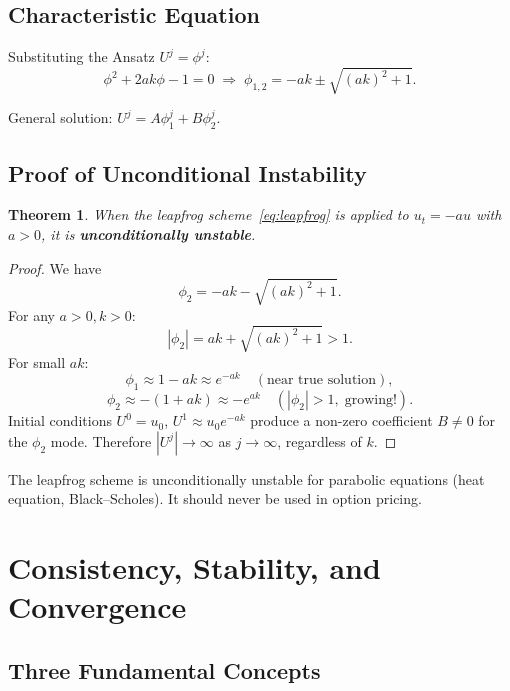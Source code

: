 \documentclass[12pt,a4paper]{article}
\theoremstyle{plain}
\newtheorem{theorem}{Theorem}[section]
\theoremstyle{definition}
\theoremstyle{remark}
\begin{document}
\subsection{Characteristic Equation}

Substituting the Ansatz $U^{j}=\phi^{j}$:
\[
  \phi^{2}+2ak\phi-1=0
  \;\Longrightarrow\;
  \phi_{1,2}=-ak\pm\sqrt{(ak)^{2}+1}.
\]

General solution: $U^{j}=A\phi_{1}^{j}+B\phi_{2}^{j}$.

\subsection{Proof of Unconditional Instability}

\begin{theorem}
When the leapfrog scheme~\eqref{eq:leapfrog} is applied to
$u_{t}=-au$ with $a>0$, it is \textbf{unconditionally unstable}.
\end{theorem}

\begin{proof}
We have
\[
  \phi_{2}=-ak-\sqrt{(ak)^{2}+1}.
\]
For any $a>0,k>0$:
\[
  |\phi_{2}|=ak+\sqrt{(ak)^{2}+1}>1.
\]
For small $ak$:
\[
  \phi_{1}\approx 1-ak\approx e^{-ak}\quad(\text{near true solution}),
\]
\[
  \phi_{2}\approx-(1+ak)\approx-e^{ak}\quad(|\phi_{2}|>1,\;\text{growing!}).
\]
Initial conditions $U^{0}=u_{0}$, $U^{1}\approx u_{0}e^{-ak}$ produce
a non-zero coefficient $B\neq0$ for the $\phi_{2}$ mode.  Therefore
$|U^{j}|\to\infty$ as $j\to\infty$, regardless of $k$.
\end{proof}

\begin{warnbox}
The leapfrog scheme is unconditionally unstable for parabolic equations
(heat equation, Black--Scholes).  It should never be used in option pricing.
\end{warnbox}

\section{Consistency, Stability, and Convergence}

\subsection{Three Fundamental Concepts}
\end{document}
